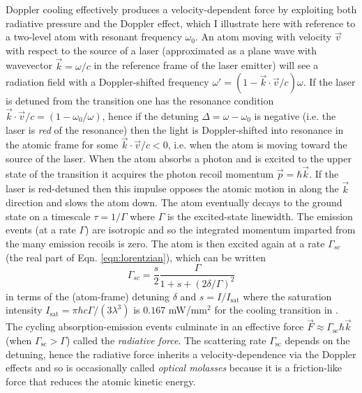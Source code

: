 	Doppler cooling effectively produces a velocity-dependent force by exploiting both radiative pressure and the Doppler effect, which I illustrate here with reference to a two-level atom with resonant frequency $\omega_0$.
	An atom moving with velocity $\vec{v}$ with respect to the source of a laser (approximated as a plane wave with wavevector $\vec{k} = \omega/c$ in the reference frame of the laser emitter) will see a radiation field with a Doppler-shifted frequency $\omega' = (1 - \vec{k}\cdot \vec{v}/c)\omega$.
	If the laser is detuned from the transition one has the resonance condition $\vec{k} \cdot \vec{v}/c = (1 - \omega_0/\omega)$, hence if the detuning $\Delta = \omega-\omega_0$ is negative (i.e. the laser is \emph{red} of the resonance) then the light is Doppler-shifted into resonance in the atomic frame for some $\vec{k} \cdot \vec{v}/c<0$, i.e. when the atom is moving toward the source of the laser. 
	When the atom absorbs a photon and is excited to the upper state of the transition it acquires the photon recoil momentum $\vec{p} = \hbar \vec{k}$.
	If the laser is red-detuned then this impulse opposes the atomic motion in along the $\vec{k}$ direction and slows the atom down.
	The atom eventually decays to the ground state on a timescale $\tau = 1/\Gamma$ where $\Gamma$ is the excited-state linewidth.
	The emission events (at a rate $\Gamma$) are isotropic and so the integrated momentum imparted from the many emission recoils is zero.
	The atom is then excited again at a rate $\Gamma_{sc}$ (the real part of Eqn. \ref{eqn:lorentzian}), which can be written 
	\begin{equation}
		\Gamma_{sc} = \frac{s}{2 }\frac{\Gamma}{1 + s + (2\delta/\Gamma)^2}
	\end{equation}	
	in terms of the (atom-frame) detuning $\delta$ and $s=I/I_\textrm{sat}$ where the saturation intensity $I_\textrm{sat} = \pi h c \Gamma/(3\lambda^3)$ is $0.167$ mW/mm$^2$ for the cooling transition in \mhe \cite{BaldwinReview}.
	The cycling absorption-emission events culminate in an effective force $\vec{F} \approx \Gamma_\textrm{sc}\hbar\vec{k}$ (when $\Gamma_\textrm{sc}>\Gamma$) called the \emph{radiative force}. 
	The scattering rate $\Gamma_\textrm{sc}$ depends on the detuning, hence the radiative force inherits a velocity-dependence via the Doppler effects and so is occasionally called \emph{optical molasses} because it is a friction-like force that reduces the atomic kinetic energy.


